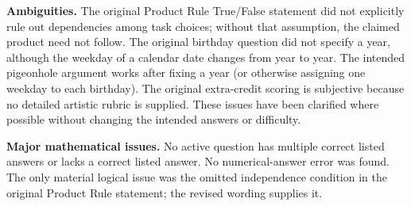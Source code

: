 \documentclass[11pt,addpoints]{exam}
\begin{document}
\begin{questions}
\textbf{Ambiguities.} The original Product Rule True/False statement did not explicitly rule out dependencies among task choices; without that assumption, the claimed product need not follow. The original birthday question did not specify a year, although the weekday of a calendar date changes from year to year. The intended pigeonhole argument works after fixing a year (or otherwise assigning one weekday to each birthday). The original extra-credit scoring is subjective because no detailed artistic rubric is supplied. These issues have been clarified where possible without changing the intended answers or difficulty.

\textbf{Major mathematical issues.} No active question has multiple correct listed answers or lacks a correct listed answer. No numerical-answer error was found. The only material logical issue was the omitted independence condition in the original Product Rule statement; the revised wording supplies it.

\end{questions}
\end{document}
